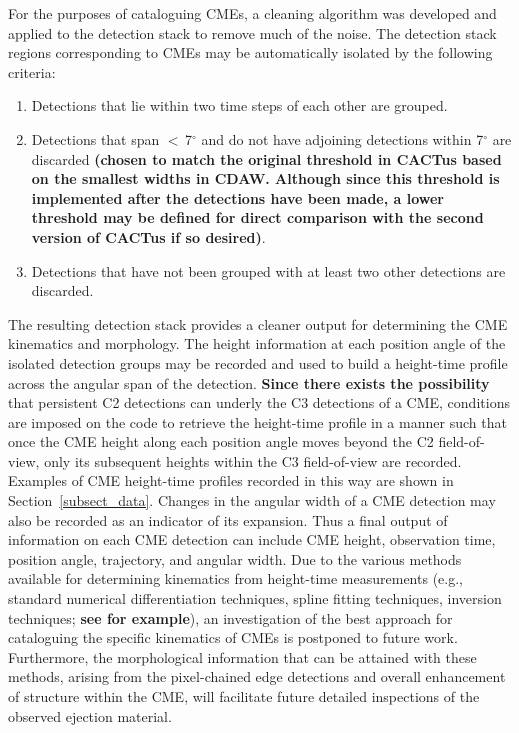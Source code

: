 \documentclass[preprint2]{aastex}
\begin{document}
{For the purposes of cataloguing CMEs, a cleaning algorithm was developed and applied to the detection stack to remove much of the noise.} The detection stack regions corresponding to CMEs may be automatically isolated by the following criteria:
\begin{enumerate}
\item Detections that lie within two time steps of each other are grouped.
\item Detections that span $<$\,7$^{\circ}$ and do not have adjoining detections within 7$^{\circ}$ are discarded {\bf (chosen to match the original threshold in CACTus based on the smallest widths in CDAW. Although since this threshold is implemented after the detections have been made, a lower threshold may be defined for direct comparison with the second version of CACTus if so desired)}.
\item Detections that have not been grouped with at least two other detections are discarded.
\end{enumerate}
The resulting detection stack provides a cleaner output for determining the CME kinematics and morphology. The height information at each position angle of the isolated detection groups may be recorded and used to build a height-time profile across the angular span of the detection. {\bf Since there exists the possibility} that persistent C2 detections can underly the C3 detections of a CME, conditions are imposed on the code to retrieve the height-time profile in a manner such that once the CME height along each position angle moves beyond the C2 field-of-view, only its subsequent heights within the C3 field-of-view are recorded. Examples of CME height-time profiles recorded in this way are shown in Section~\ref{subsect_data}. Changes in the angular width of a CME detection may also be recorded as an indicator of its expansion. Thus a final output of information on each CME detection can include CME height, observation time, position angle, trajectory, and angular width. Due to the various methods available for determining kinematics from height-time measurements (e.g., standard numerical differentiation techniques, spline fitting techniques, inversion techniques; {\bf see \citealt{2010ApJ...712.1410T} for example}), an investigation of the best approach for cataloguing the specific kinematics of CMEs is postponed to future work. Furthermore, the morphological information that can be attained with these methods, arising from the pixel-chained edge detections and overall enhancement of structure within the CME, will facilitate future detailed inspections of the observed ejection material.
\end{document}
